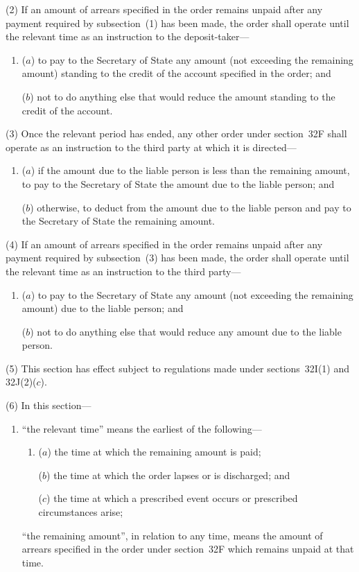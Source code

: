 \documentclass[12pt,a4paper]{article}
\begin{document}
(2) If an amount of arrears specified in the order remains unpaid after any payment required by subsection~(1) has been made, the order shall operate until the relevant time as an instruction to the deposit-taker---
\begin{enumerate}\item[]
($a$) to pay to the 
Secretary of State  %
any amount (not exceeding the remaining
amount) standing to the credit of the account specified in the order; and

($b$) not to do anything else that would reduce the amount standing to the credit
of the account.
\end{enumerate}

(3) Once the relevant period has ended, any other order under section~32F shall
operate as an instruction to the third party at which it is directed---
\begin{enumerate}\item[]
($a$) if the amount due to the liable person is less than the remaining amount, to
pay to the 
Secretary of State  %
the amount due to the liable person; and

($b$) otherwise, to deduct from the amount due to the liable person and pay to the
Secretary of State  %
the remaining amount.
\end{enumerate}

(4) If an amount of arrears specified in the order remains unpaid after any payment
required by subsection~(3) has been made, the order shall operate until the relevant
time as an instruction to the third party---
\begin{enumerate}\item[]
($a$) to pay to the 
Secretary of State  %
any amount (not exceeding the remaining
amount) due to the liable person; and

($b$) not to do anything else that would reduce any amount due to the liable
person.
\end{enumerate}

(5) This section has effect subject to regulations made under sections~32I(1) and
32J(2)($c$).

(6) In this section---
\begin{enumerate}\item[]
“the relevant time” means the earliest of the following---
\begin{enumerate}\item[]
($a$) the time at which the remaining amount is paid;

($b$) the time at which the order lapses or is discharged; and

($c$) the time at which a prescribed event occurs or prescribed circumstances
arise;
\end{enumerate}

“the remaining amount”, in relation to any time, means the amount of arrears
specified in the order under section~32F which remains unpaid at that time.
\end{enumerate}
\end{document}
